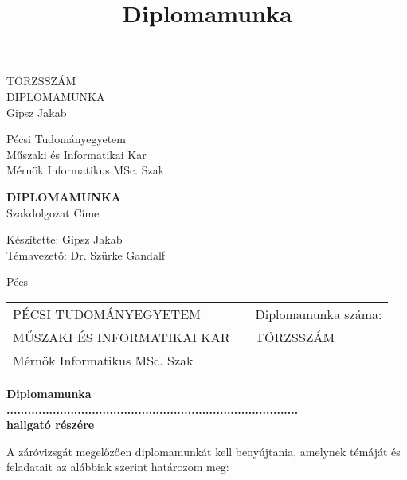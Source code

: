 \documentclass[oneside,a4paper,9pt]{article}
\title {Diplomamunka}
\begin{document}
	\thispagestyle{empty}
	\begin{center}
		\LARGE
		TÖRZSSZÁM\\
		\Huge
		\vspace{80mm}
		DIPLOMAMUNKA\\
		\vspace{90mm}
		\Large
		Gipsz Jakab\\
	\end{center}
	\pagebreak
	\thispagestyle{empty}
	\begin{center}
		\Large
		\begin{spacing}{1}
			Pécsi Tudományegyetem\\
			Műszaki és Informatikai Kar\\
			Mérnök Informatikus MSc. Szak\\
		\end{spacing}
		\Huge
		\vspace{80mm}
		{\bf DIPLOMAMUNKA}\\
		\bigskip
		\Large
		Szakdolgozat Címe\\
		\vspace{60mm}
		\Large
		\begin{spacing}{1}
			Készítette: Gipsz Jakab\\
			Témavezető: Dr. Szürke Gandalf\\
		\end{spacing}
		\bigskip
		\bigskip
		Pécs
	\end{center}
	
	\pagebreak
	\thispagestyle{empty}
	
	\begin{center}
		\bf
		\begin{tabularx}{\textwidth}{
				>{\hsize=0.5\hsize}X
				>{\hsize=0.2\hsize}X
				>{\hsize=0.3\hsize}X}
			PÉCSI TUDOMÁNYEGYETEM & & Diplomamunka száma:\\
			MŰSZAKI ÉS INFORMATIKAI KAR & & TÖRZSSZÁM\\
			Mérnök Informatikus MSc. Szak & & \\
		\end{tabularx}
	\end{center}
	\vspace{20mm}
	\begin{center}
		\bf
		Diplomamunka\\
		\bigskip\bigskip
		..................................................................................\\
		hallgató részére
		\bigskip\bigskip
	\end{center}
	\noindent
	A záróvizsgát megelőzően diplomamunkát kell benyújtania, amelynek témáját és feladatait az alábbiak szerint határozom meg:\\
	
\end{document}
